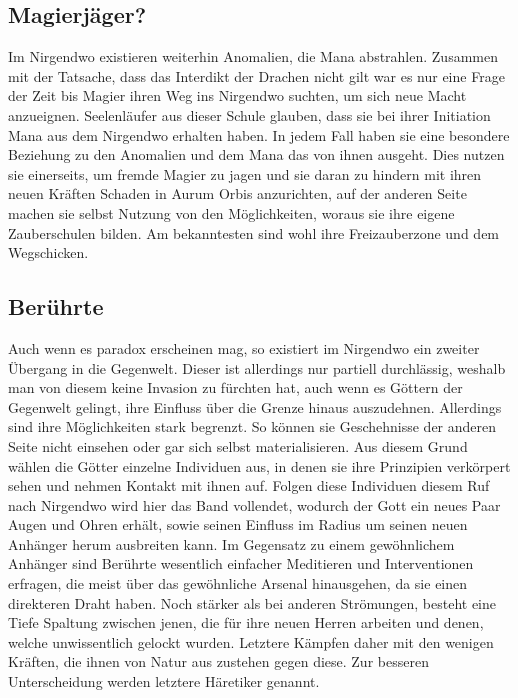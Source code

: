 \documentclass[a4paper,12pt,oneside]{book}
\begin{document}
\subsection{Magierjäger?}
Im Nirgendwo existieren weiterhin Anomalien, die Mana abstrahlen. Zusammen mit der Tatsache, dass das Interdikt der Drachen nicht gilt war es nur eine Frage der Zeit bis Magier ihren Weg ins Nirgendwo suchten, um sich neue Macht anzueignen. Seelenläufer aus dieser Schule glauben, dass sie bei ihrer Initiation Mana aus dem Nirgendwo erhalten haben. In jedem Fall haben sie eine besondere Beziehung zu den Anomalien und dem Mana das von ihnen ausgeht. Dies nutzen sie einerseits, um fremde Magier zu jagen und sie daran zu hindern mit ihren neuen Kräften Schaden in Aurum Orbis anzurichten, auf der anderen Seite machen sie selbst Nutzung von den Möglichkeiten, woraus sie ihre eigene Zauberschulen bilden. Am bekanntesten sind wohl ihre Freizauberzone und dem Wegschicken. 
\subsection{Berührte}
Auch wenn es paradox erscheinen mag, so existiert im Nirgendwo ein zweiter Übergang in die Gegenwelt. Dieser ist allerdings nur partiell durchlässig, weshalb man von diesem keine Invasion zu fürchten hat, auch wenn es Göttern der Gegenwelt gelingt, ihre Einfluss über die Grenze hinaus auszudehnen. Allerdings sind ihre Möglichkeiten stark begrenzt. So können sie Geschehnisse der anderen Seite nicht einsehen oder gar sich selbst materialisieren. Aus diesem Grund wählen die Götter einzelne Individuen aus, in denen sie ihre Prinzipien verkörpert sehen und nehmen Kontakt mit ihnen auf. Folgen diese Individuen diesem Ruf nach Nirgendwo wird hier das Band vollendet, wodurch der Gott ein neues Paar Augen und Ohren erhält, sowie seinen Einfluss im Radius um seinen neuen Anhänger herum ausbreiten kann. Im Gegensatz zu einem gewöhnlichem Anhänger sind Berührte wesentlich einfacher Meditieren und Interventionen erfragen, die meist über das gewöhnliche Arsenal hinausgehen, da sie einen direkteren Draht haben. Noch stärker als bei anderen Strömungen, besteht eine Tiefe Spaltung zwischen jenen, die für ihre neuen Herren arbeiten und denen, welche unwissentlich gelockt wurden. Letztere Kämpfen daher mit den wenigen Kräften, die ihnen von Natur aus zustehen gegen diese. Zur besseren Unterscheidung werden letztere Häretiker genannt.
\end{document}
